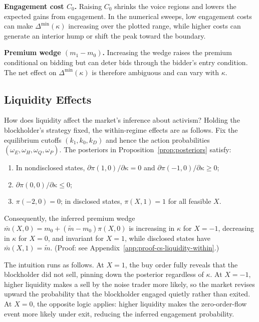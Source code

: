 \documentclass[11pt]{article}
\newcommand{\1}{\mathbf{1}}
\begin{document}
\textbf{Engagement cost $C_0$.} Raising $C_0$ shrinks the voice regions and lowers the expected gains from engagement. In the numerical sweeps, low engagement costs can make $\Delta^{\min}(\kappa)$ increasing over the plotted range, while higher costs can generate an interior hump or shift the peak toward the boundary.

\textbf{Premium wedge $(m_1 - m_0)$.} Increasing the wedge raises the premium conditional on bidding but can deter bids through the bidder's entry condition. The net effect on $\Delta^{\min}(\kappa)$ is therefore ambiguous and can vary with $\kappa$.

%
\subsection{Liquidity Effects}
%

How does liquidity affect the market's inference about activism? Holding the blockholder's strategy fixed, the within-regime effects are as follows. Fix the equilibrium cutoffs $(k_1,k_0,k_D)$ and hence the action probabilities $(\omega_E,\omega_H,\omega_Q,\omega_P)$. The posteriors in Proposition~\ref{prop:posteriors} satisfy:
\begin{enumerate}[label=\textup{(\alph*)},leftmargin=2em]
\item In nondisclosed states, $\partial \pi(1,0)/\partial \kappa = 0$ and $\partial \pi(-1,0)/\partial \kappa \ge 0$;
\item $\partial \pi(0,0)/\partial \kappa \le 0$;
\item $\pi(-2,0)=0$; in disclosed states, $\pi(X,1)=1$ for all feasible $X$.
\end{enumerate}
Consequently, the inferred premium wedge $\bar{m}(X,0)=m_0+(\tilde{m}-m_0)\pi(X,0)$ is increasing in $\kappa$ for $X=-1$, decreasing in $\kappa$ for $X=0$, and invariant for $X=1$, while disclosed states have $\bar{m}(X,1)=\tilde{m}$. (Proof: see Appendix~\ref{app:proof-cs-liquidity-within}.)

The intuition runs as follows. At $X=1$, the buy order fully reveals that the blockholder did not sell, pinning down the posterior regardless of $\kappa$. At $X=-1$, higher liquidity makes a sell by the noise trader more likely, so the market revises upward the probability that the blockholder engaged quietly rather than exited. At $X=0$, the opposite logic applies: higher liquidity makes the zero-order-flow event more likely under exit, reducing the inferred engagement probability.
\end{document}
